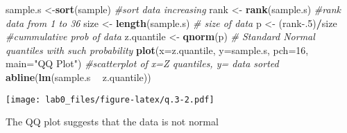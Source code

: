 \documentclass[
]{article}
\newenvironment{Shaded}{\begin{snugshade}}{\end{snugshade}}
\newcommand{\CommentTok}[1]{\textcolor[rgb]{0.56,0.35,0.01}{\textit{#1}}}
\newcommand{\DataTypeTok}[1]{\textcolor[rgb]{0.13,0.29,0.53}{#1}}
\newcommand{\DecValTok}[1]{\textcolor[rgb]{0.00,0.00,0.81}{#1}}
\newcommand{\FloatTok}[1]{\textcolor[rgb]{0.00,0.00,0.81}{#1}}
\newcommand{\KeywordTok}[1]{\textcolor[rgb]{0.13,0.29,0.53}{\textbf{#1}}}
\newcommand{\NormalTok}[1]{#1}
\newcommand{\OperatorTok}[1]{\textcolor[rgb]{0.81,0.36,0.00}{\textbf{#1}}}
\newcommand{\StringTok}[1]{\textcolor[rgb]{0.31,0.60,0.02}{#1}}
\begin{document}
\begin{Shaded}
\begin{Highlighting}[]
\NormalTok{sample.s <-}\KeywordTok{sort}\NormalTok{(sample) }\CommentTok{#sort data increasing}
\NormalTok{rank <-}\StringTok{ }\KeywordTok{rank}\NormalTok{(sample.s) }\CommentTok{#rank data from 1 to 36}
\NormalTok{size <-}\StringTok{ }\KeywordTok{length}\NormalTok{(sample.s) }\CommentTok{# size of data}
\NormalTok{p <-}\StringTok{ }\NormalTok{(rank}\FloatTok{-.5}\NormalTok{)}\OperatorTok{/}\NormalTok{size }\CommentTok{#cummulative prob of data}
\NormalTok{z.quantile <-}\StringTok{ }\KeywordTok{qnorm}\NormalTok{(p) }\CommentTok{# Standard Normal quantiles with such probability}
\KeywordTok{plot}\NormalTok{(}\DataTypeTok{x=}\NormalTok{z.quantile, }\DataTypeTok{y=}\NormalTok{sample.s, }\DataTypeTok{pch=}\DecValTok{16}\NormalTok{, }\DataTypeTok{main=}\StringTok{"QQ Plot"}\NormalTok{) }\CommentTok{#scatterplot of x=Z quantiles, y= data sorted}
\KeywordTok{abline}\NormalTok{(}\KeywordTok{lm}\NormalTok{(sample.s }\OperatorTok{~}\StringTok{ }\NormalTok{z.quantile))}
\end{Highlighting}
\end{Shaded}

\texttt{[image: lab0\_files/figure-latex/q.3-2.pdf]}

The QQ plot suggests that the data is not normal
\end{document}

